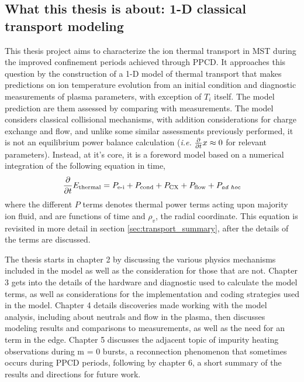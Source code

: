 \begin{refsection}
\section{What this thesis is about: 1-D classical transport modeling}

This thesis project aims to characterize the ion thermal transport in MST during the improved confinement periods achieved through PPCD. It approaches this question by the construction of a 1-D model of thermal transport that makes predictions on ion temperature evolution from an initial condition and diagnostic measurements of plasma parameters, with exception of $T_i$ itself. The model prediction are them assessed by comparing with measurements. The model considers classical collisional mechanisms, with addition considerations for charge exchange and flow, and unlike some similar assessments previously performed, it is not an equilibrium power balance calculation (\textit{i.e.} $\frac{\partial}{\partial t} x \approx 0$ for relevant parameters). Instead, at it's core, it is a foreword model based on a numerical integration of the following equation in time,
\begin{align}
    \frac{\partial}{\partial t} E_\text{thermal} = P_\text{e-i} + P_\text{cond} + P_\text{CX} + P_\text{flow} + P_\textit{ad hoc}
\end{align}
where the different $P$ terms denotes thermal power terms acting upon majority ion fluid, and are functions of time and $\rho_v$, the radial coordinate. This equation is revisited in more detail in section \ref{sec:transport_summary}, after the details of the terms are discussed. 

The thesis starts in chapter 2 by discussing the various physics mechanisms included in the model as well as the consideration for those that are not. Chapter 3 gets into the details of the hardware and diagnostic used to calculate the model terms, as well as considerations for the implementation and coding strategies used in the model. Chapter 4 details discoveries made working with the model analysis, including about neutrals and flow in the plasma, then discusses modeling results and comparisons to measurements, as well as the need for an \adhoc term in the edge. Chapter 5 discusses the adjacent topic of impurity heating observations during m = 0 bursts, a reconnection phenomenon that sometimes occurs during PPCD periods, following by chapter 6, a short summary of the results and directions for future work.


\end{refsection}
